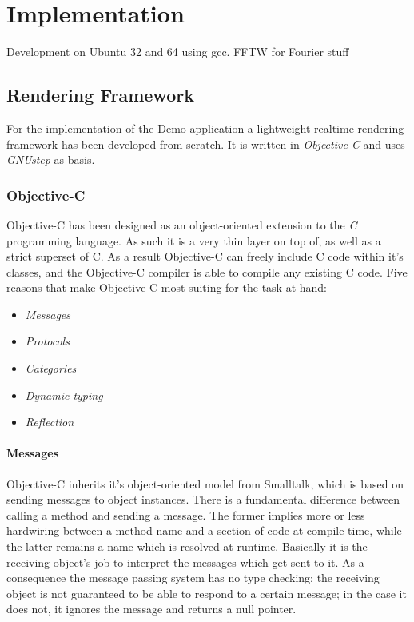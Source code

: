 \chapter{Implementation}

Development on Ubuntu 32 and 64 using gcc.
FFTW for Fourier stuff

\section{Rendering Framework}

For the implementation of the Demo application a lightweight realtime
rendering framework has been developed from scratch. It is written in
\textit{Objective-C} and uses \textit{GNUstep} as basis.

\subsection{Objective-C}

Objective-C has been designed as an object-oriented extension to the
\textit{C} programming language. As such it is a very thin layer on top of, as
well as a strict superset of C. As a result Objective-C can freely include C
code within it's classes, and the Objective-C compiler is able to compile any
existing C code. 
Five reasons that make Objective-C most suiting for the task at hand:

\begin{itemize}
 \item \textit{Messages}
 \item \textit{Protocols}
 \item \textit{Categories}
 \item \textit{Dynamic typing}
 \item \textit{Reflection}
\end{itemize}

\subsubsection{Messages}
Objective-C inherits it's object-oriented model from Smalltalk, which is based
on sending messages to object instances. There is a fundamental difference
between calling a method and sending a message. The former implies more or less
hardwiring between a method name and a section of code at compile time, while
the latter remains a name which is resolved at runtime. Basically it is the
receiving object's job to interpret the messages which get sent to it. As a
consequence the message passing system has no type checking: the receiving
object is not guaranteed to be able to respond to a certain message; in the
case it does not, it ignores the message and returns a null pointer.


